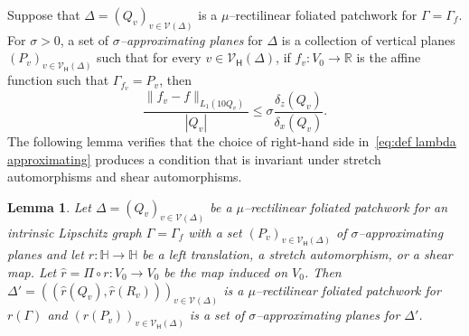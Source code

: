 \documentclass[11pt,reqno]{amsart}
\renewcommand{\H}{\mathbb{H}}
\newcommand{\R}{\mathbb{R}}
\newcommand{\cV}{\mathcal{V}}
\newcommand{\ud}[0]{\,\mathrm{d}}
\newcommand{\0}{\mathbf{0}}
\renewcommand{\1}{\mathbf 1}
\newcommand{\from}{\colon}
\renewcommand{\le}{\leqslant}
\newtheorem{lemma}[thm]{Lemma}
\theoremstyle{remark}
\newcommand{\cVh}{{\mathcal{V}_{\mathsf{H}}}}
\begin{document}
Suppose that $\Delta=(Q_v)_{v\in \cV(\Delta)}$ is a $\mu$--rectilinear foliated patchwork for $\Gamma=\Gamma_f$. For $\sigma>0$, a set of \emph{$\sigma$--approximating planes} for $\Delta$ is a collection of vertical planes $(P_v)_{v\in \cVh(\Delta)}$ such that for every $v\in \cVh(\Delta)$, if $f_v\from V_0\to \R$ is the affine function such that $\Gamma_{f_v}=P_v$, then
\begin{equation}\label{eq:def lambda approximating}
 \frac{\|f_v-f\|_{L_1(10 Q_v)}}{ |Q_v|}%
  \le \sigma\frac{\delta_z(Q_v)}{\delta_x(Q_v)}.
\end{equation}
The following lemma verifies that the choice of right-hand side in~\eqref{eq:def lambda approximating} produces a condition that is invariant under stretch automorphisms and shear automorphisms.
\begin{lemma}\label{lem:foliatedPatchworksInvariant}
  Let $\Delta=(Q_v)_{v\in \cV(\Delta)}$ be a $\mu$--rectilinear foliated patchwork for an intrinsic Lipschitz graph $\Gamma=\Gamma_f$ with a set $(P_v)_{v\in \cVh(\Delta)}$ of $\sigma$--approximating planes and let $r\from \H\to \H$ be a left translation, a stretch automorphism, or a shear map.  Let $\hat{r}=\Pi\circ r\from V_0\to V_0$ be the map induced on $V_0$.  Then $\Delta'=((\hat{r}(Q_v),\hat{r}(R_v)))_{v\in \cV(\Delta)}$ is a $\mu$--rectilinear foliated patchwork for $r(\Gamma)$ and $(r(P_v))_{v\in \cVh(\Delta)}$ is a set of $\sigma$--approximating planes for $\Delta'$.
\end{lemma}
\end{document}
